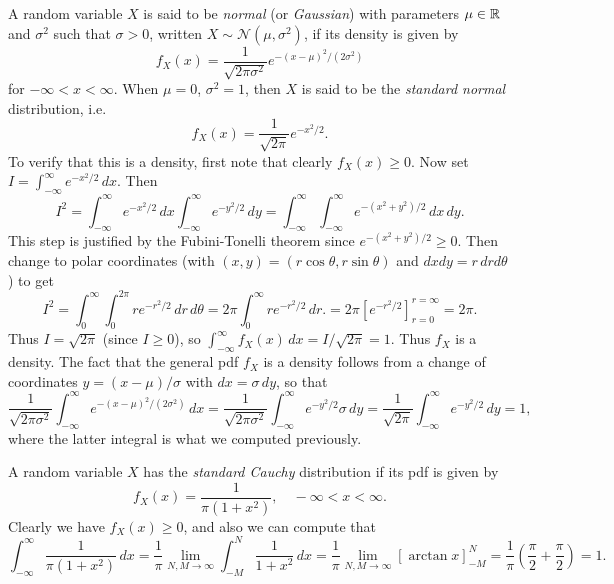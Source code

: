 \begin{example}
  A random variable $X$ is said to be \emph{normal}
  (or \emph{Gaussian}) with parameters $\mu \in \mathbb{R}$
  and $\sigma^2$ such that $\sigma > 0$, written
  $X \sim \mathcal{N}(\mu, \sigma^2)$,
  if its density is given by
  \[
    f_X(x) = \frac{1}{\sqrt{2\pi \sigma^2}} e^{-(x - \mu)^2 / (2\sigma^2)}
  \]
  for $-\infty < x < \infty$.
  When $\mu = 0$, $\sigma^2 = 1$, then $X$ is
  said to be the \emph{standard normal} distribution,
  i.e.
  \[
    f_X(x) = \frac{1}{\sqrt{2\pi}} e^{-x^2 / 2}.
  \]
  To verify that this is a density,
  first note that clearly $f_X(x) \ge 0$.
  Now set $\displaystyle I = \int_{-\infty}^\infty e^{-x^2 / 2} \, dx$.
  Then
  \[
    I^2 = \int_{-\infty}^\infty e^{-x^2 / 2} \, dx \int_{-\infty}^\infty e^{-y^2 / 2} \, dy
    = \int_{-\infty}^\infty \int_{-\infty}^\infty e^{-(x^2 + y^2) / 2} \, dx \, dy.
  \]
  This step is justified by the Fubini-Tonelli theorem
  since $e^{-(x^2 + y^2) / 2} \ge 0$. Then change
  to polar coordinates (with $(x, y) = (r\cos \theta, r \sin \theta)$ and $dx dy = r\, dr d\theta$)
  to get
  \[
    I^2 =
    \int_0^\infty
    \int_0^{2\pi}
    r e^{-r^2 / 2}
    \, dr \, d\theta
    = 2\pi \int_0^\infty r e^{-r^2 / 2} \, dr.
    = 2\pi \left[ e^{-r^2 / 2} \right]_{r = 0}^{r = \infty}
    = 2\pi.
  \]
  Thus $I = \sqrt{2\pi}$ (since $I \ge 0$), so
  $\displaystyle \int_{-\infty}^\infty f_X(x) \, dx = I / \sqrt{2\pi} = 1$. Thus $f_X$ is a density.
  The fact that the general pdf $f_X$ is a density
  follows from a change of coordinates
  $y = (x - \mu) / \sigma$ with $dx = \sigma\, dy$,
  so that
  \[
    \frac{1}{\sqrt{2\pi \sigma^2}}
    \int_{-\infty}^\infty e^{-(x - \mu)^2 / (2\sigma^2)} \, dx
    = \frac{1}{\sqrt{2\pi \sigma^2}} \int_{-\infty}^\infty
    e^{-y^2 / 2} \sigma\, dy = \frac{1}{\sqrt{2\pi}} \int_{-\infty}^\infty e^{-y^2 / 2} \, dy = 1,
  \]
  where the latter integral is what we
  computed previously.
\end{example}

\begin{example}
  A random variable $X$ has the
  \emph{standard Cauchy} distribution if
  its pdf is given by
  \[
    f_X(x) = \frac{1}{\pi(1 + x^2)}, \quad
    -\infty < x < \infty.
  \]
  Clearly we have $f_X(x) \ge 0$, and also we can
  compute that
  \[
    \int_{-\infty}^\infty \frac{1}{\pi(1 + x^2)} \, dx
    = \frac{1}{\pi} \lim_{N, M \to \infty}
    \int_{-M}^N \frac{1}{1 + x^2} \, dx
    = \frac{1}{\pi} \lim_{N, M \to \infty}
    \left[\arctan x\right]_{-M}^N
    = \frac{1}{\pi} \left(\frac{\pi}{2} + \frac{\pi}{2}\right)
    = 1.
  \]
\end{example}

